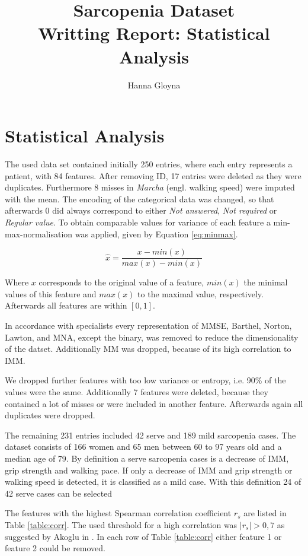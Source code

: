 \documentclass[11pt]{article}
\author{Hanna Gloyna}
\title{Sarcopenia Dataset\\
		\large Writting Report: Statistical Analysis}
\date{}
\begin{document}
\twocolumn
\maketitle
\thispagestyle{fancy}

\section{Statistical Analysis}
The used data set contained initially 250 entries, where each entry represents a patient, with 84 features. After removing ID, 17 entries were deleted as they were duplicates. Furthermore 8 misses in \emph{Marcha} (engl. walking speed) were imputed with the mean. The encoding of the categorical data was changed, so that afterwards $0$ did always correspond to either \emph{Not answered}, \emph{Not required} or \emph{Regular value}. To obtain comparable values for variance of each feature a min-max-normalisation was applied, given by Equation \ref{eq:minmax}.

\begin{equation}\label{eq:minmax}
\hat{x} = \frac{x-min(x)}{max(x)-min(x)}
\end{equation}

Where $x$ corresponds to the original value of a feature, $min(x)$ the minimal values of this feature and $max(x)$ to the maximal value, respectively. Afterwards all features are within $\left[0,1\right]$.

In accordance with specialists every representation of MMSE, Barthel, Norton, Lawton, and MNA, except the binary, was removed to reduce the dimensionality of the datset. Additionally MM was dropped, because of its high correlation to IMM.

We dropped further features with too low variance or entropy, i.e. 90\% of the values were the same. Additionally 7 features were deleted, because they contained a lot of misses or were included in another feature. Afterwards again all duplicates were dropped.

The remaining 231 entries included 42 serve and 189 mild sarcopenia cases. The dataset consists of 166 women and 65 men between 60 to 97 years old and a median age of 79. By definition a serve sarcopenia cases is a decrease of IMM, grip strength and walking pace. If only a decrease of IMM and grip strength or walking speed is detected, it is classified as a mild case. With this definition 24 of 42 serve cases can be selected

The features with the highest Spearman correlation coefficient $r_s$ are listed in Table \ref{table:corr}. The used threshold for a high correlation was $|r_s| > 0,7$ as suggested by Akoglu in \cite{akoglu_users_2018}. In each row of Table \ref{table:corr} either feature 1 or feature 2 could be removed.
\end{document}
